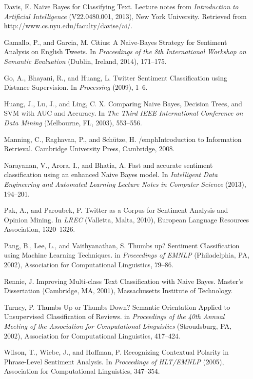 \documentclass[letter,12pt]{article}
\begin{document}
\begin{thebibliography}{9}

  Davis, E. Naive Bayes for Classifying Text. Lecture notes from
  \emph{Introduction to Artificial Intelligence} (V22.0480.001, 2013), New York
  University.
  Retrieved from http://www.cs.nyu.edu/faculty/davise/ai/.

  Gamallo, P., and Garcia, M. Citius: A Naive-Bayes Strategy for Sentiment
  Analysis on English Tweets. In \emph{Proceedings of the 8th International
  Workshop on Semantic Evaluation} (Dublin, Ireland, 2014), 171--175.

  Go, A., Bhayani, R.,  and Huang, L. Twitter Sentiment Classification using
  Distance Supervision. In \emph{Processing} (2009), 1--6.

  Huang, J., Lu, J., and Ling, C. X. Comparing Naive Bayes, Decision Trees, and
  SVM with AUC and Accuracy. In \emph{The Third IEEE International Conference
  on Data Mining} (Melbourne, FL, 2003), 553--556.

  Manning, C., Raghavan, P., and Schütze, H. /emph{Introduction to Information
  Retrieval}. Cambridge University Press, Cambridge, 2008.

  Narayanan, V., Arora, I., and Bhatia, A. Fast and accurate sentiment
  classification using an enhanced Naive Bayes model. In \emph{Intelligent Data
  Engineering and Automated Learning Lecture Notes in Computer Science} (2013),
  194--201.

  Pak, A., and Paroubek, P. Twitter as a Corpus for Sentiment Analysis and
  Opinion Mining. In \emph{LREC} (Valletta, Malta, 2010), European Language
  Resources Association, 1320--1326.

  Pang, B., Lee, L., and Vaithyanathan, S.
  Thumbs up? Sentiment Classification using Machine Learning Techniques.
  in \emph{Proceedings of EMNLP} (Philadelphia, PA, 2002), Association for
  Computational Linguistics, 79--86.

  Rennie, J. Improving Multi-class Text Classification with Naive Bayes.
  Master's Dissertation (Cambridge, MA, 2001), Massachusetts Institute of
  Technology.

  Turney, P.
  Thumbs Up or Thumbs Down? Semantic Orientation Applied to
  Unsupervised Classification of Reviews.
  in \emph{Proceedings of the 40th Annual Meeting of the Association for
  Computational Linguistics} (Stroudsburg, PA, 2002), Association for
  Computational Linguistics, 417--424.

  Wilson, T., Wiebe, J., and Hoffman, P. Recognizing Contextual Polarity in
  Phrase-Level Sentiment Analysis. In \emph{Proceedings of HLT/EMNLP} (2005),
  Association for Computational Linguistics, 347--354.

\end{thebibliography}
\end{document}
